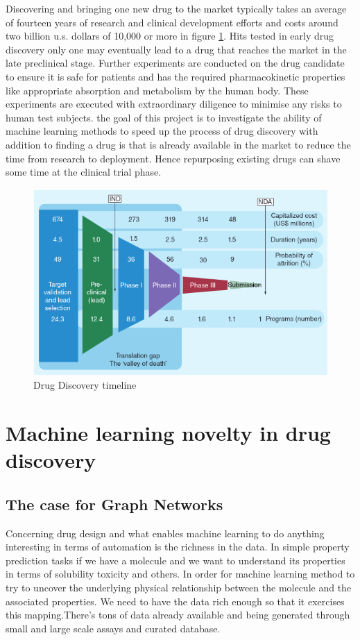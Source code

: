 \documentclass[10pt,twocolumn,letterpaper]{article}
\begin{document}
 Discovering and bringing one new drug to the market typically takes an average of fourteen years of research \cite{Zurdo2013} and clinical development efforts and costs around two billion u.s. dollars of 10,000 or more in figure \ref{fig:drug_valley}. Hits tested in early drug discovery only one may eventually lead to a drug that reaches the market in the late preclinical stage. Further experiments are conducted on the drug candidate to ensure it is safe for patients and has the required pharmacokinetic properties like appropriate absorption and metabolism by the human body. These experiments are executed with extraordinary diligence to minimise any risks to human test subjects. the goal of this project is to investigate the ability of machine learning methods to speed up the process of drug discovery with addition to finding a drug is that is already available in the market to reduce the time from research to deployment. Hence repurposing existing drugs can shave some time at the clinical trial phase. 

\begin{figure}[h!]
  \includegraphics[width=\linewidth]{drug_valley.png}
  \caption{Drug Discovery timeline }
  \label{fig:drug_valley}
\end{figure}


\section{Machine learning novelty in drug discovery}
\subsection{The case for Graph Networks}

Concerning drug design and what enables machine learning to do anything interesting in terms of automation is the richness in the data. In simple property prediction tasks if we have a molecule and  we want to understand its properties in terms of solubility toxicity and others. In order for machine learning method to try to uncover the underlying physical relationship between the molecule and the associated properties. We need to have the data rich enough so that it exercises this mapping.There's tons of data already available and being generated through small and large scale assays and curated database. 
\end{document}
